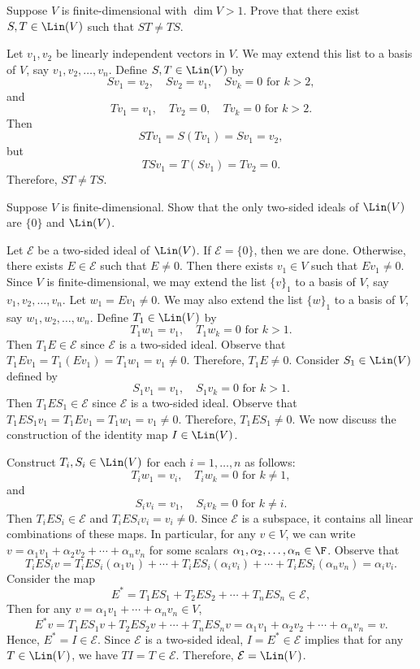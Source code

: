 \begin{exc}
\begin{exercise}
Suppose $V$ is finite-dimensional with $\dim V>1$. Prove that there exist
$S,T\in\Lin(V)$ such that $ST\ne TS$.
\end{exercise}
\begin{solution}
Let $v_1,v_2$ be linearly independent vectors in $V$. We may extend this list
to a basis of $V$, say $v_1,v_2,\dots,v_n$. Define $S,T\in\Lin(V)$ by
\[ Sv_1=v_2, \quad Sv_2=v_1, \quad Sv_k=0 \text{ for } k>2, \]
and
\[ Tv_1=v_1, \quad Tv_2=0, \quad Tv_k=0 \text{ for } k>2. \]
Then
\[ STv_1=S(Tv_1)=Sv_1=v_2, \]
but
\[ TSv_1=T(Sv_1)=Tv_2=0. \]
Therefore, $ST\ne TS$.
\end{solution}

\begin{exercise}
Suppose $V$ is finite-dimensional. Show that the only two-sided ideals of
$\Lin(V)$ are $\{0\}$ and $\Lin(V)$.
\end{exercise}
\begin{solution}
Let $\mathcal{E}$ be a two-sided ideal of $\Lin(V)$. If $\mathcal{E}=\{0\}$,
then we are done. Otherwise, there exists $E\in\mathcal{E}$ such that $E\ne0$.
Then there exists $v_1\in V$ such that $Ev_1\ne0$. Since $V$ is
finite-dimensional, we may extend the list $\{v\}_1$ to a basis of $V$, say
$v_1,v_2,\dots,v_n$. Let $w_1=Ev_1\ne0$. We may also extend the list
$\{w\}_1$ to a basis of $V$, say $w_1,w_2,\dots,w_n$. Define
$T_1\in\Lin(V)$ by
\[ T_1w_1=v_1, \quad T_1w_k=0 \text{ for } k>1. \]
Then $T_1E\in\mathcal{E}$ since $\mathcal{E}$ is a two-sided ideal. Observe
that $T_1Ev_1=T_1(Ev_1)=T_1w_1=v_1\ne0$. Therefore, $T_1E\ne0$. Consider
$S_1\in\Lin(V)$ defined by
\[ S_1v_1=v_1, \quad S_1v_k=0 \text{ for } k>1. \]
Then $T_1ES_1\in\mathcal{E}$ since $\mathcal{E}$ is a two-sided ideal.
Observe that $T_1ES_1v_1=T_1Ev_1=T_1w_1=v_1\ne0$. Therefore, $T_1ES_1\ne0$.
We now discuss the construction of the identity map $I\in\Lin(V)$.

Construct $T_i,S_i\in\Lin(V)$ for each $i=1,\dots,n$ as follows:
\[ T_iw_1=v_i, \quad T_iw_k=0 \text{ for } k\ne1, \]
and
\[ S_iv_i=v_1, \quad S_iv_k=0 \text{ for } k\ne i. \]
Then $T_iES_i\in\mathcal{E}$ and $T_iES_iv_i=v_i\ne0$. Since $\mathcal{E}$ is
a subspace, it contains all linear combinations of these maps. In particular,
for any $v\in V$, we can write $v=\alpha_1v_1+\alpha_2v_2+\cdots+\alpha_nv_n$
for some scalars $\alpha_1,\alpha_2,\dots,\alpha_n\in\F$. Observe that
\[ T_iES_iv=T_iES_i(\alpha_1v_1)+\cdots+T_iES_i(\alpha_iv_i)+\cdots
   +T_iES_i(\alpha_nv_n)=\alpha_iv_i. \]
Consider the map
\[ E^*=T_1ES_1+T_2ES_2+\cdots+T_nES_n\in\mathcal{E}, \]
Then for any $v=\alpha_1v_1+\cdots+\alpha_nv_n\in V$,
\[ E^*v=T_1ES_1v+T_2ES_2v+\cdots+T_nES_nv
   =\alpha_1v_1+\alpha_2v_2+\cdots+\alpha_nv_n=v. \]
Hence, $E^*=I\in\mathcal{E}$. Since $\mathcal{E}$ is a two-sided ideal,
$I=E^*\in\mathcal{E}$ implies that for any $T\in\Lin(V)$, we have
$TI=T\in\mathcal{E}$. Therefore, $\mathcal{E}=\Lin(V)$.
\end{solution}
\end{exc}

